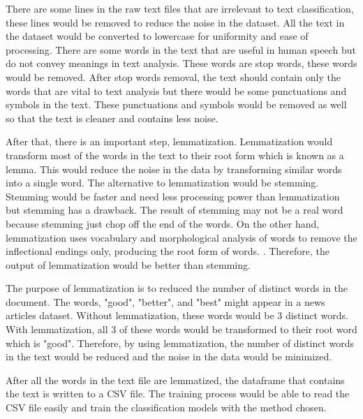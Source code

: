 There are some lines in the raw text files that are irrelevant to text classification, these lines would be removed to reduce the noise in the dataset. All the text in the dataset would be converted to lowercase for uniformity and ease of processing. There are some words in the text that are useful in human speech but do not convey meanings in text analysis. These words are stop words, these words would be removed. After stop words removal, the text should contain only the words that are vital to text analysis but there would be some punctuations and symbols in the text. These punctuations and symbols would be removed as well so that the text is cleaner and contains less noise.

After that, there is an important step, lemmatization. Lemmatization would transform most of the words in the text to their root form which is known as a lemma. This would reduce the noise in the data by transforming similar words into a single word. The alternative to lemmatization would be stemming. Stemming would be faster and need less processing power than lemmatization but stemming has a drawback. The result of stemming may not be a real word because stemming just chop off the end of the words. On the other hand, lemmatization uses vocabulary and morphological analysis of words to remove the inflectional endings only, producing the root form of words. \cite{stemLemma}. Therefore, the output of lemmatization would be better than stemming.

The purpose of lemmatization is to reduced the number of distinct words in the document. The words, "good", "better", and "best" might appear in a news articles dataset. Without lemmatization, these words would be 3 distinct words. With lemmatization, all 3 of these words would be transformed to their root word which is "good". Therefore, by using lemmatization, the number of distinct words in the text would be reduced and the noise in the data would be minimized.

After all the words in the text file are lemmatized, the dataframe that contains the text is written to a CSV file. The training process would be able to read the CSV file easily and train the classification models with the method chosen.\\


